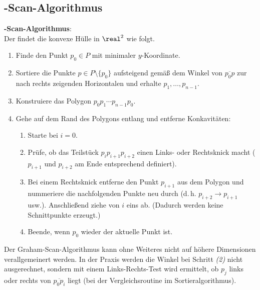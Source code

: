 \subsection{%
    -Scan-Algorithmus%
}

\textbf{-Scan-Algorithmus}:\\
Der  findet die konvexe Hülle in $\real^2$ wie folgt.
\begin{enumerate}
    \item
    Finde den Punkt $p_0 \in P$ mit minimaler $y$-Koordinate.
    
    \item
    Sortiere die Punkte $p \in P \setminus \{p_0\}$ aufsteigend gemäß dem Winkel
    von $\overline{p_0 p}$ zur nach rechts zeigenden Horizontalen und erhalte
    $p_1, \dotsc, p_{n-1}$.
    
    \item
    Konstruiere das Polygon $p_0 p_1 \dotsb p_{n-1} p_0$.
    
    \item
    Gehe auf dem Rand des Polygons entlang und entferne Konkavitäten:
    \begin{enumerate}[label=\emph{(\roman*)}]
        \item
        Starte bei $i = 0$.
        
        \item
        Prüfe, ob das Teilstück $p_i p_{i+1} p_{i+2}$ einen Links- oder Rechtsknick macht
        ($p_{i+1}$ und $p_{i+2}$ am Ende entsprechend definiert).
        
        \item
        Bei einem Rechtsknick entferne den Punkt $p_{i+1}$ aus dem Polygon und
        nummeriere die nachfolgenden Punkte neu durch (d.\,h. $p_{i+2} \rightarrow p_{i+1}$ usw.).
        Anschließend ziehe von $i$ eins ab.
        (Dadurch werden keine Schnittpunkte erzeugt.)
        
        \item
        Beende, wenn $p_0$ wieder der aktuelle Punkt ist.
    \end{enumerate}
\end{enumerate}
Der Graham-Scan-Algorithmus kann ohne Weiteres nicht auf höhere Dimensionen verallgemeinert werden.
In der Praxis werden die Winkel bei Schritt \emph{(2)} nicht ausgerechnet, sondern
mit einem Links-Rechts-Test wird ermittelt, ob $p_j$ links oder rechts von $\overline{p_0 p_i}$
liegt (bei der Vergleichsroutine im Sortieralgorithmus).

